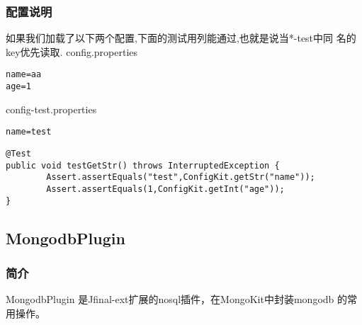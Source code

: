 \documentclass{scrartcl}
\begin{document}
\subsubsection{配置说明}
\label{sec-2-5-2}

 如果我们加载了以下两个配置,下面的测试用列能通过,也就是说当*-test中同
 名的key优先读取.
config.properties

\begin{verbatim}
name=aa
age=1
\end{verbatim}

config-test.properties

\begin{verbatim}
name=test
\end{verbatim}


\begin{verbatim}
@Test
public void testGetStr() throws InterruptedException {
        Assert.assertEquals("test",ConfigKit.getStr("name"));
        Assert.assertEquals(1,ConfigKit.getInt("age"));
}
\end{verbatim}
\subsection{MongodbPlugin}
\label{sec-2-6}
\subsubsection{简介}
\label{sec-2-6-1}

   MongodbPlugin 是Jfinal-ext扩展的nosql插件，在MongoKit中封装mongodb
   的常用操作。
\end{document}
